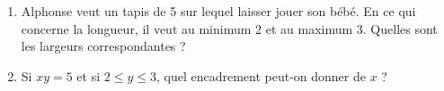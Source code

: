 
\begin{exercice}\label{exosmath-0256}

    \begin{enumerate}
        \item
    Alphonse veut un tapis de \unit{5}{\square\meter} sur lequel laisser jouer son bébé. En ce qui concerne la longueur, il veut au minimum \unit{2}{\meter} et au maximum \unit{3}{\meter}. Quelles sont les largeurs correspondantes ?
\item
    Si \( xy=5\) et si \( 2\leq y\leq 3\), quel encadrement peut-on donner de \( x\) ?
    \end{enumerate}

\end{exercice}
